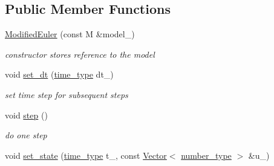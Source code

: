 \subsection*{Public Member Functions}
\begin{DoxyCompactItemize}
\item 
\hypertarget{classhdnum_1_1ModifiedEuler_ac7ad8c2a695fa27a8666dd4cd5a2e105}{
\hyperlink{classhdnum_1_1ModifiedEuler_ac7ad8c2a695fa27a8666dd4cd5a2e105}{ModifiedEuler} (const M \&model\_\-)}
\label{classhdnum_1_1ModifiedEuler_ac7ad8c2a695fa27a8666dd4cd5a2e105}

\begin{DoxyCompactList}\small\item\em constructor stores reference to the model \item\end{DoxyCompactList}\item 
\hypertarget{classhdnum_1_1ModifiedEuler_ad40c382bf56183ddb0a86e327d3ac7ac}{
void \hyperlink{classhdnum_1_1ModifiedEuler_ad40c382bf56183ddb0a86e327d3ac7ac}{set\_\-dt} (\hyperlink{classhdnum_1_1ModifiedEuler_a1c273cddcddf36f6e47f713080c06b41}{time\_\-type} dt\_\-)}
\label{classhdnum_1_1ModifiedEuler_ad40c382bf56183ddb0a86e327d3ac7ac}

\begin{DoxyCompactList}\small\item\em set time step for subsequent steps \item\end{DoxyCompactList}\item 
\hypertarget{classhdnum_1_1ModifiedEuler_a1842b79faa9c19fb406c0dfe92ae613d}{
void \hyperlink{classhdnum_1_1ModifiedEuler_a1842b79faa9c19fb406c0dfe92ae613d}{step} ()}
\label{classhdnum_1_1ModifiedEuler_a1842b79faa9c19fb406c0dfe92ae613d}

\begin{DoxyCompactList}\small\item\em do one step \item\end{DoxyCompactList}\item 
\hypertarget{classhdnum_1_1ModifiedEuler_a5fed8e518bd7f3f12e58c1cc6e6121fb}{
void \hyperlink{classhdnum_1_1ModifiedEuler_a5fed8e518bd7f3f12e58c1cc6e6121fb}{set\_\-state} (\hyperlink{classhdnum_1_1ModifiedEuler_a1c273cddcddf36f6e47f713080c06b41}{time\_\-type} t\_\-, const \hyperlink{classhdnum_1_1Vector}{Vector}$<$ \hyperlink{classhdnum_1_1ModifiedEuler_abcfd3cb8a5b446f721582af3b170476e}{number\_\-type} $>$ \&u\_\-)}
\label{classhdnum_1_1ModifiedEuler_a5fed8e518bd7f3f12e58c1cc6e6121fb}


\end{DoxyCompactItemize}
